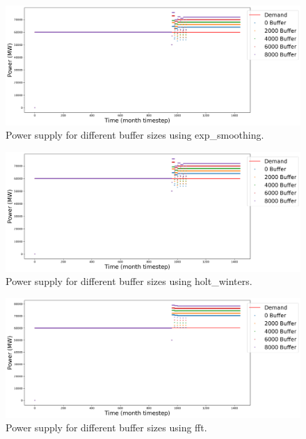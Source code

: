 \documentclass[11pt]{article}
\begin{document}
\begin{figure}[!h]
	\centering
	\includegraphics[width=\textwidth]{29-figures/29-power-buffer-exp_smoothing.png} 
	\hfill
	\caption{Power supply for different buffer sizes using exp\_smoothing.}
	\label{fig:29-buf-exp_smoothing}
\end{figure}

\begin{figure}[!h]
	\centering
	\includegraphics[width=\textwidth]{29-figures/29-power-buffer-holt_winters.png} 
	\hfill
	\caption{Power supply for different buffer sizes using holt\_winters.}
	\label{fig:29-buf-hots_winters}
\end{figure}

\begin{figure}[!h]
	\centering
	\includegraphics[width=\textwidth]{29-figures/29-power-buffer-fft.png} 
	\hfill
	\caption{Power supply for different buffer sizes using fft.}
	\label{fig:29-buf-fft}
\end{figure}
\end{document}

